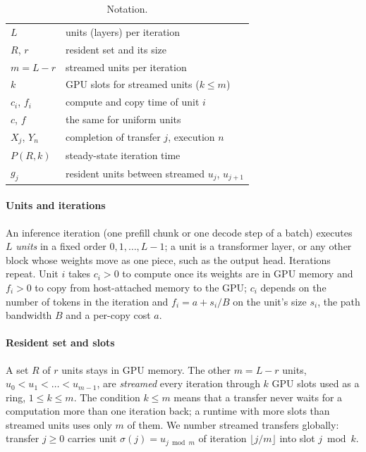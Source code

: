\documentclass[final,5p,times,twocolumn]{elsarticle}
\theoremstyle{definition}
\newcommand{\Res}{R}
\newcommand{\per}{P}
\begin{document}
\begin{table}[t]
\centering
\caption{Notation.}
\label{tab:notation}
\small
\begin{tabular}{ll}
\toprule
$L$ & units (layers) per iteration\\
$\Res$, $r$ & resident set and its size\\
$m=L-r$ & streamed units per iteration\\
$k$ & GPU slots for streamed units ($k\le m$)\\
$c_i$, $f_i$ & compute and copy time of unit $i$\\
$c$, $f$ & the same for uniform units\\
$X_j$, $Y_n$ & completion of transfer $j$, execution $n$\\
$\per(\Res,k)$ & steady-state iteration time\\
$g_j$ & resident units between streamed $u_j$, $u_{j+1}$\\
\bottomrule
\end{tabular}
\end{table}

\paragraph{Units and iterations}
An inference iteration (one prefill chunk or one decode step of a batch) executes $L$ \emph{units} in a fixed order $0,1,\dots,L-1$; a unit is a transformer layer, or any other block whose weights move as one piece, such as the output head. Iterations repeat. Unit $i$ takes $c_i>0$ to compute once its weights are in GPU memory and $f_i>0$ to copy from host-attached memory to the GPU; $c_i$ depends on the number of tokens in the iteration and $f_i=a+s_i/B$ on the unit's size $s_i$, the path bandwidth $B$ and a per-copy cost $a$.

\paragraph{Resident set and slots}
A set $\Res$ of $r$ units stays in GPU memory. The other $m=L-r$ units, $u_0<u_1<\dots<u_{m-1}$, are \emph{streamed} every iteration through $k$ GPU slots used as a ring, $1\le k\le m$. The condition $k\le m$ means that a transfer never waits for a computation more than one iteration back; a runtime with more slots than streamed units uses only $m$ of them. We number streamed transfers globally: transfer $j\ge0$ carries unit $\sigma(j)=u_{j \bmod m}$ of iteration $\lfloor j/m\rfloor$ into slot $j \bmod k$.
\end{document}

